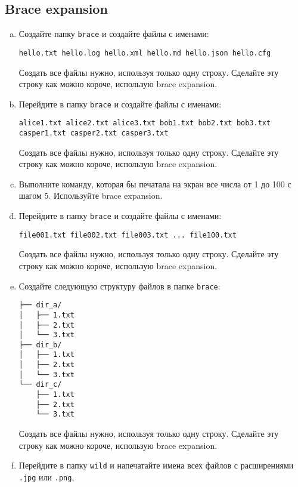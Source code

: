 \documentclass{article}
\begin{document}
\subsection{Brace expansion}
\begin{enumerate}[a.]
\item Создайте папку \texttt{brace} и создайте файлы с именами:
\begin{verbatim}
hello.txt hello.log hello.xml hello.md hello.json hello.cfg
\end{verbatim}
Создать все файлы нужно, используя только одну строку. Сделайте эту строку как можно короче, использую brace expansion.

\item Перейдите в папку \texttt{brace} и создайте файлы с именами:
\begin{verbatim}
alice1.txt alice2.txt alice3.txt bob1.txt bob2.txt bob3.txt casper1.txt casper2.txt casper3.txt
\end{verbatim}
Создать все файлы нужно, используя только одну строку. Сделайте эту строку как можно короче, использую brace expansion.

\item Выполните команду, которая бы печатала на экран все числа от 1 до 100 с шагом 5. Используйте brace expansion.

\item Перейдите в папку \texttt{brace} и создайте файлы с именами:
\begin{verbatim}
file001.txt file002.txt file003.txt ... file100.txt
\end{verbatim}
Создать все файлы нужно, используя только одну строку. Сделайте эту строку как можно короче, использую brace expansion.

\item Создайте следующую структуру файлов в папке \texttt{brace}:
\begin{center}
\begin{BVerbatim}
├── dir_a/
│   ├── 1.txt
│   ├── 2.txt
│   └── 3.txt
├── dir_b/
│   ├── 1.txt
│   ├── 2.txt
│   └── 3.txt
└── dir_c/
    ├── 1.txt
    ├── 2.txt
    └── 3.txt
\end{BVerbatim}
\end{center}
Создать все файлы нужно, используя только одну строку. Сделайте эту строку как можно короче, использую brace expansion.

\item Перейдите в папку \texttt{wild} и напечатайте имена всех файлов с расширениями \texttt{.jpg} или \texttt{.png}, 
\end{enumerate}
\end{document}
